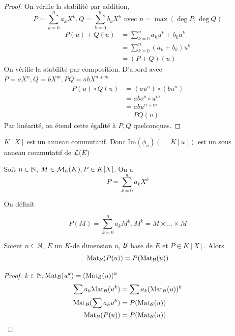 \documentclass[]{report}
\begin{document}
    \begin{proof}
        On vérifie la stabilité par addition,
        \[P=\sum_{k=0}^n a_k X^k,Q=\sum_{k=0}^nb_k X^k\text{ avec }n=\max(\deg P,\deg Q)\]
        \begin{align*}P(u)+Q(u)&=\sum_{k=0}^n a_k u^k+b_k u^k\\
        &=\sum_{k=0}^n (a_k+b_k)u^k\\
        &=(P+Q)(u)\end{align*}
        On vérifie la stabilité par composition. D'abord avec $P=aX^n,Q=bX^m,PQ=abX^{n+m}$
        \begin{align*}P(u)\circ Q(u)&=(au^n)\circ (bu^n)\\
        &= abo^n\circ u^m\\
        &=abu^{n+m}\\
        &=PQ(u)\end{align*}
        Par linéarité, on étend cette égalité à $P,Q$ quelconques.
    \end{proof}

    $K[X]$ est un anneau commutatif. Donc $\text{Im}(\phi_u)(=K[u])$ est un sous anneau commutatif de $\mathcal{L}(E)$

    \begin{df}{}{}
        Soit $n\in\mathbb{N}$, $M\in\mathcal{M}_n(K),P\in K[X]$. On a
        \[P=\sum_{k=0}^n a_k X^k\]
        \begin{center}
            On définit
        \end{center}
        \[P(M)=\sum_{k=0}^n a_k M^k, M^k=M\times \ldots\times M\]
    \end{df}

    \begin{prop}{}{}
        Soient $n\in\mathbb{N}$, $E$ un $K$-\ev de dimension $n$, $\mathcal{B}$ base de $E$ et $P\in K[X]$. Alors
        \[\text{Mat}_{\mathcal{B}} (P(u))=P(\text{Mat}_{\mathcal{B}}(u))\]
    \end{prop}

    \begin{proof}
        $k\in\mathbb{N},\text{Mat}_{\mathcal{B}}(u^k)=(\text{Mat}_{\mathcal{B}}(u))^k$
        \begin{align*}
            \sum a_k \text{Mat}_{\mathcal{B}}( u^k)&=\sum a_k(\text{Mat}_{\mathcal{B}} (u))^k\\
            \text{Mat}_{\mathcal{B}}(\sum a_k u^k)&=P(\text{Mat}_{\mathcal{B}}(u))\\
            \text{Mat}_{\mathcal{B}}(P(u))&=P(\text{Mat}_{\mathcal{B}}(u))
        \end{align*}
    \end{proof}
\end{document}
